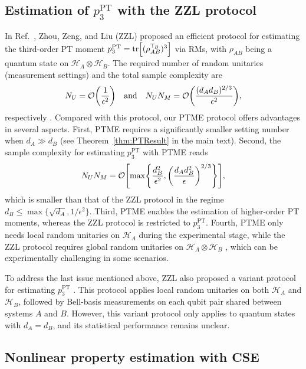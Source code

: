 \documentclass[aps,prl,twocolumn,nofootinbib,superscriptaddress,10pt]{revtex4-2}
\let\originalleft\left
\let\originalright\right
\renewcommand{\left}{\mathopen{}\mathclose\bgroup\originalleft}
\renewcommand{\right}{\aftergroup\egroup\originalright}
\DeclareMathOperator{\Tr}{tr}
\newcommand{\bigo}[1]{\mathcal{O}\left(#1\right)}
\theoremstyle{plain}
\theoremstyle{definition}
\newcommand{\PT}{\mathrm{PT}}
\newcommand{\caH}{\mathcal{H}}
\newcommand{\tref}[1]{Theorem~\ref{#1}}
\begin{document}
\subsection{Estimation of \texorpdfstring{$p_3^{\PT}$}{} with the ZZL protocol}
In Ref.~\cite{singlezhou}, Zhou, Zeng, and Liu (ZZL) proposed an efficient protocol for estimating the third-order PT moment 
$p_3^{\PT}=\Tr\left[(\rho_{AB}^{\top_{\! B}})^3\right]$ via RMs, with $\rho_{AB}$ being a quantum state on $\caH_A\otimes \caH_B$. 
The required number of random unitaries (measurement settings) and the total sample complexity are 
\begin{align}
N_U=\bigo{\frac{1}{\epsilon^2}}
\quad \text{and} \quad
N_UN_M=\bigo{ \frac{(d_Ad_B)^{2/3}}{\epsilon^2} }, 
\end{align}
respectively \cite{singlezhou}. 
Compared with this protocol, our PTME protocol offers advantages in several aspects. 
First, PTME  requires a significantly smaller setting number when $d_A\gg d_B$ (see \tref{thm:PTResult} in the main text). 
Second, the sample complexity for estimating $p_3^{\PT}$ with PTME reads 
\begin{align}
N_U N_M=  \mathcal O \left[\max\left\lbrace \frac{d_B^2}{\epsilon^2}, 
\left(\frac{d_A d_B^2}{\epsilon}\right)^{2/3} \right\rbrace \right], 
\end{align}
which is smaller than that of the ZZL protocol in the regime $d_B\leq \max\{\sqrt{d_A},1/\epsilon^2\}$. 
Third, PTME enables the estimation of higher-order PT moments, whereas the ZZL protocol is restricted to $p_3^{\PT}$. 
Fourth, PTME only needs local random unitaries on $\caH_A$ during the experimental stage, while the ZZL protocol requires global random unitaries on $\caH_A\otimes\caH_B$ \cite{singlezhou}, which can be experimentally challenging in some scenarios.


To address the last issue mentioned above, ZZL also proposed a variant protocol for estimating $p_3^{\PT}$ \cite{singlezhou}. 
This protocol applies local random unitaries on both $\caH_A$ and $\caH_B$, followed by Bell-basis measurements on each qubit pair shared between systems $A$ and $B$. 
However, this variant protocol only applies to quantum states with $d_A=d_B$, and its statistical performance remains unclear.


\subsection{Nonlinear property estimation with CSE}
\end{document}
